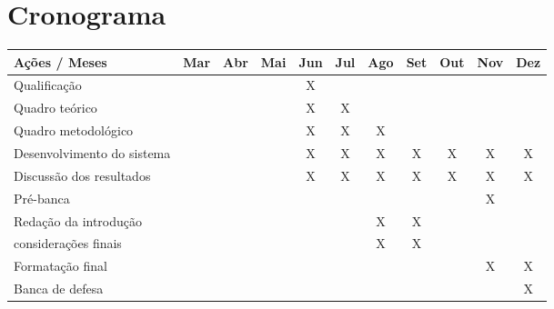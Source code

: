 
\section{Cronograma}

\begin{table}[!htpb]
\centering

\begin{small} 
  
\setlength{\tabcolsep}{8pt} 


\begin{tabular}{|l|c|c|c|c|c|c|c|c|c|c|}\hline

\textbf{Ações / Meses}& Mar & Abr & Mai & Jun & Jul & Ago & Set & Out & Nov &
Dez
\\
\hline

Qualificação & &  & & X &  &  &  &  &  &  \\ \hline

Quadro teórico & &  &  & X & X &  &  &  &  &  \\ \hline

Quadro metodológico & &  &  & X & X & X &  &  &  &  \\ \hline

Desenvolvimento do sistema & &  &  & X & X & X & X & X & X & X \\ \hline

Discussão dos resultados & &  &  & X & X & X & X & X & X & X \\\hline

Pré-banca & &  &  &  &  &  &  &  & X &  \\ \hline

Redação da introdução & &  &  &  &  & X & X & & & \\\hline 

considerações finais & &  &  &  &  & X & X & & & \\\hline

Formatação final & &  &  &  &  &  &  &  & X & X \\ \hline

Banca de defesa & &  &  &  &  &  &  &  &  & X \\ \hline


\end{tabular}
\end{small}
\end{table}
